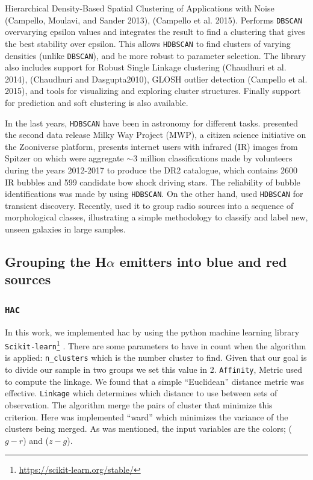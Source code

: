 \documentclass[fleqn,usenatbib]{mnras}
\begin{document}
Hierarchical Density-Based Spatial Clustering of Applications with Noise (Campello,
Moulavi, and Sander 2013), (Campello et al. 2015). Performs \texttt{DBSCAN} overvarying
epsilon values and integrates the result to find a clustering that gives the best
stability over epsilon. This allows \texttt{HDBSCAN} to find clusters of varying densities
(unlike \texttt{DBSCAN}), and be more robust to parameter selection. The library also
includes support for Robust Single Linkage clustering (Chaudhuri et al. 2014),
(Chaudhuri and Dasgupta2010), GLOSH outlier detection (Campello et al. 2015), and
tools for visualizing and exploring cluster structures. Finally support for prediction
and soft clustering is also available.

In the last years, \texttt{HDBSCAN} have been in astronomy for different tasks.
\citet{Jayasinghe:2019} presented the second data release Milky Way Project (MWP), a citizen
science initiative on the Zooniverse platform, presents internet users with infrared (IR)
images from Spitzer on which were aggregate $\sim$3 million classifications made
by volunteers during the years 2012-2017 to produce the DR2 catalogue, which
contains 2600 IR bubbles and 599 candidate bow shock driving stars.
The reliability of bubble identifications was made by using \texttt{HDBSCAN}.
On the other hand, \citet{Webb:2020} used \texttt{HDBSCAN} for transient discovery.
Recently, \citet{Ntwaetsile:2021} used it to group radio sources into a sequence
of morphological classes, illustrating a simple methodology to classify and
label new, unseen galaxies in large samples. 

\subsection{Grouping the H{$\alpha$} emitters into blue and red sources}
\label{sec:apply-hac-hdebscan}

\subsubsection{\texttt{HAC}}

In this work, we implemented {\sc hac} by using the python machine learning library
\texttt{Scikit-learn}\footnote{\url{https://scikit-learn.org/stable/}} \citep{Pedregosa:2011}.
There are some parameters to have in count
when the algorithm is applied: \texttt{n\_clusters} which is the number cluster to find. Given
that our goal is to divide our sample in two groups we set this value in 2. \texttt{Affinity},
Metric used to compute the linkage. We found that a simple ``Euclidean'' distance metric was
effective. \texttt{Linkage} which determines which distance to use between sets of observation.
The algorithm merge the pairs of cluster that minimize this criterion. Here was implemented
``ward'' which minimizes the variance of the clusters being merged. As was mentioned,
the input variables are the colors; ($g - r$) and ($z - g$).
\end{document}
